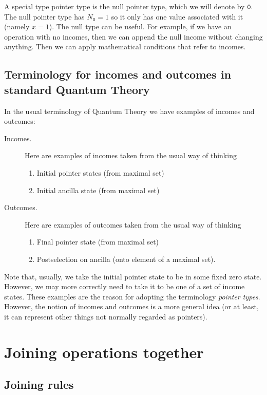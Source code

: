 \documentclass[10pt]{article}
\begin{document}
A special type pointer type is the null pointer type, which we will denote by $\mathtt{0}$.  The null pointer type has $N_\mathtt{0}=1$ so it only has one value associated with it (namely $x=1$).   The null type can be useful.  For example, if we have an operation with no incomes, then we can append the null income without changing anything.  Then we can apply mathematical conditions that refer to incomes.


\subsection{Terminology for incomes and outcomes in standard Quantum Theory}

In the usual terminology of Quantum Theory we have examples of incomes and outcomes:
\begin{description}
\item[Incomes.] Here are examples of incomes taken from the usual way of thinking
\begin{enumerate}
  \item Initial pointer states (from maximal set)
  \item Initial ancilla state (from maximal set)
\end{enumerate}
\item[Outcomes.] Here are examples of outcomes taken from the usual way of thinking
\begin{enumerate}
  \item Final pointer state (from maximal set)
  \item Postselection on ancilla (onto element of a maximal set).
\end{enumerate}
\end{description}
Note that, usually, we take the initial pointer state to be in some fixed zero state.  However, we may more correctly need to take it to be one of a set of income states.   These examples are the reason for adopting the terminology \emph{pointer types}.  However, the notion of incomes and outcomes is a more general idea (or at least, it can represent other things not normally regarded as pointers).




\section{Joining operations together}

\subsection{Joining rules}
\end{document}
